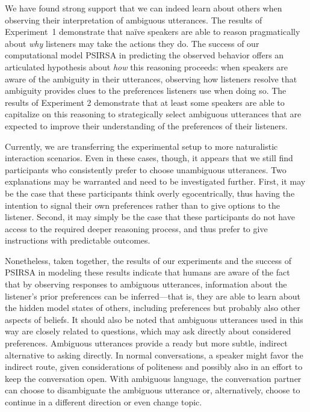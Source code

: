 \documentclass[11pt,a4paper]{article}
\newcommand{\gcs}[1]{\textcolor{blue}{[gcs: #1]}}
\begin{document}
We have found strong support that we can indeed learn about others when observing their interpretation of ambiguous utterances. 
The results of Experiment~1 demonstrate that na\"ive speakers are able to reason pragmatically about \emph{why} listeners may take the actions they do. 
The success of our computational model PSIRSA in predicting the observed behavior offers an articulated hypothesis about \emph{how} this reasoning proceeds: when speakers are aware of the ambiguity in their utterances, observing how listeners resolve that ambiguity provides clues to the preferences listeners use when doing so.
The results of Experiment 2 demonstrate that at least some speakers are able to capitalize on this reasoning to strategically select ambiguous utterances that are expected to improve their understanding of the preferences of their listeners.

 
Currently, we are transferring the experimental setup to more naturalistic interaction scenarios. 
Even in these cases, though, it appears that we still find participants who consistently prefer to choose unambiguous utterances. 
Two explanations may be warranted and need to be investigated further. 
First, it may be the case that these participants think overly egocentrically, thus having the intention to signal their own preferences rather than to give options to the listener. 
Second, it may simply be the case that these participants do not have access to the required deeper reasoning process, and thus prefer to give instructions with predictable outcomes. 

Nonetheless, taken together, the results of our experiments and the success of PSIRSA in modeling these results indicate that humans are aware of the fact that by observing responses to ambiguous utterances, information about the listener's prior preferences can be inferred---that is, they are able to learn about the hidden model states of others, including preferences but probably also other aspects of beliefs. 
It should also be noted that ambiguous utterances used in this way are closely related to questions, which may ask directly about considered preferences. Ambiguous utterances provide a ready but more subtle, indirect alternative to asking directly. 
In normal conversations, a speaker might favor the indirect route, given considerations of politeness and possibly also in an effort to keep the conversation open. 
With ambiguous language, the conversation partner can choose to disambiguate the ambiguous utterance or, alternatively, choose to continue in a different direction or even change topic.
\end{document}
